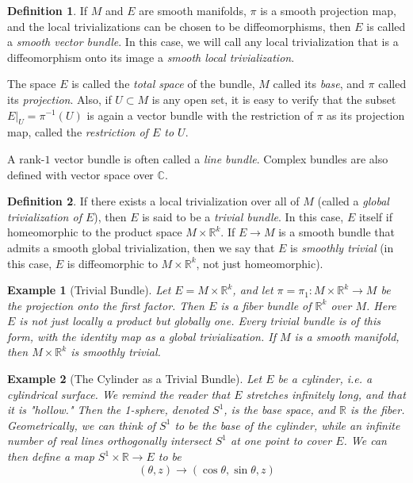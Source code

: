 \documentclass{article}
\newtheorem{example}{Example}[section]
\theoremstyle{remark}
\theoremstyle{definition}
\newtheorem{definition}{Definition}[section]
\begin{document}
  \begin{definition}
  If $M$ and $E$ are smooth manifolds, $\pi$ is a smooth projection map, and the local trivializations can be chosen to be diffeomorphisms, then $E$ is called a \textit{smooth vector bundle}. In this case, we will call any local trivialization that is a diffeomorphism onto its image a \textit{smooth local trivialization}. 

  The space $E$ is called the \textit{total space} of the bundle, $M$ called its \textit{base}, and $\pi$ called its \textit{projection}. Also, if $U \subset M$ is any open set, it is easy to verify that the subset $E |_U = \pi^{-1} (U)$ is again a vector bundle with the restriction of $\pi$ as its projection map, called the \textit{restriction of $E$ to $U$}. 
  \end{definition}

  A rank-$1$ vector bundle is often called a \textit{line bundle}. Complex bundles are also defined with vector space over $\mathbb{C}$. 

  \begin{definition}
  If there exists a local trivialization over all of $M$ (called a \textit{global trivialization of $E$}), then $E$ is said to be a \textit{trivial bundle}. In this case, $E$ itself if homeomorphic to the product space $M \times \mathbb{R}^k$. If $E \longrightarrow M$ is a smooth bundle that admits a smooth global trivialization, then we say that $E$ is \textit{smoothly trivial} (in this case, $E$ is diffeomorphic to $M \times \mathbb{R}^k$, not just homeomorphic). 
  \end{definition}

  \begin{example}[Trivial Bundle]
  Let $E = M \times \mathbb{R}^k$, and let $\pi = \pi_1: M \times \mathbb{R}^k \longrightarrow M$ be the projection onto the first factor. Then $E$ is a fiber bundle of $\mathbb{R}^k$ over $M$. Here $E$ is not just locally a product but \textit{globally} one. Every trivial bundle is of this form, with the identity map as a global trivialization. If $M$ is a smooth manifold, then $M \times \mathbb{R}^k$ is smoothly trivial. 
  \end{example}

  \begin{example}[The Cylinder as a Trivial Bundle]
  Let $E$ be a cylinder, i.e. a cylindrical surface. We remind the reader that $E$ stretches infinitely long, and that it is "hollow." Then the 1-sphere, denoted $S^1$, is the base space, and $\mathbb{R}$ is the fiber. Geometrically, we can think of $S^1$ to be the base of the cylinder, while an infinite number of real lines orthogonally intersect $S^1$ at one point to cover $E$. We can then define a map $ S^1 \times \mathbb{R} \longrightarrow E$ to be 
  \[ (\theta, z) \longrightarrow (\cos{\theta}, \sin{\theta}, z) \]
  \end{example}
\end{document}
